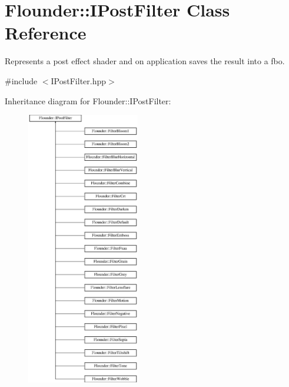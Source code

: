 \hypertarget{class_flounder_1_1_i_post_filter}{}\section{Flounder\+:\+:I\+Post\+Filter Class Reference}
\label{class_flounder_1_1_i_post_filter}


Represents a post effect shader and on application saves the result into a fbo.  




{\ttfamily \#include $<$I\+Post\+Filter.\+hpp$>$}

Inheritance diagram for Flounder\+:\+:I\+Post\+Filter\+:\begin{figure}[H]
\begin{center}
\leavevmode
\includegraphics[height=12.000000cm]{class_flounder_1_1_i_post_filter}
\end{center}
\end{figure}
